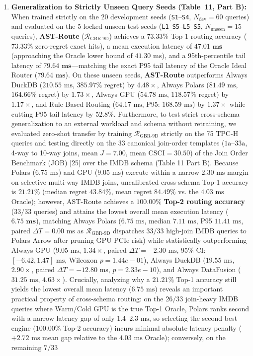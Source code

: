 \documentclass[10pt,a4paper]{article}
\begin{document}
\begin{enumerate}[leftmargin=1.5em,itemsep=2pt]
    \item \textbf{Generalization to Strictly Unseen Query Seeds (Table~11, Part B):} When trained strictly on the 20 development seeds (\texttt{S1}--\texttt{S4}, $N_{\text{dev}}=60$ queries) and evaluated on the 5 locked unseen test seeds (\texttt{L1\_S5}--\texttt{L5\_S5}, $N_{\text{unseen}}=15$ queries), \textbf{AST-Route} ($\mathcal{R}_{\text{GBR-9D}}$) achieves a $\mathbf{73.33\%}$ Top-1 routing accuracy ($\mathbf{73.33\%}$ zero-regret exact hits), a mean execution latency of $\mathbf{47.01\text{ ms}}$ (approaching the Oracle lower bound of $41.30\text{ ms}$), and a 95th-percentile tail latency of $\mathbf{79.64\text{ ms}}$---matching the exact P95 tail latency of the Oracle Ideal Router ($\mathbf{79.64\text{ ms}}$). On these unseen seeds, \textbf{AST-Route} outperforms Always DuckDB ($210.55\text{ ms}$, $385.97\%$ regret) by $\mathbf{4.48\times}$, Always Polars ($81.49\text{ ms}$, $164.66\%$ regret) by $\mathbf{1.73\times}$, Always GPU ($54.78\text{ ms}$, $118.57\%$ regret) by $\mathbf{1.17\times}$, and Rule-Based Routing ($64.17\text{ ms}$, P95: $168.59\text{ ms}$) by $\mathbf{1.37\times}$ while cutting P95 tail latency by $\mathbf{52.8\%}$. Furthermore, to test strict cross-schema generalization to an external workload and schema without retraining, we evaluated zero-shot transfer by training $\mathcal{R}_{\text{GBR-9D}}$ strictly on the 75 TPC-H queries and testing directly on the 33 canonical join-order templates ($1\text{a}$--$33\text{a}$, 4-way to 10-way joins, mean $J=7.00$, mean $\text{CSCI}=30.50$) of the Join Order Benchmark (JOB) [25] over the IMDB schema (Table 11 Part B). Because Polars ($6.75\text{ ms}$) and GPU ($9.05\text{ ms}$) execute within a narrow $2.30\text{ ms}$ margin on selective multi-way IMDB joins, uncalibrated cross-schema Top-1 accuracy is $21.21\%$ (median regret $43.84\%$, mean regret $84.49\%$ vs. the $4.03\text{ ms}$ Oracle); however, AST-Route achieves a $\mathbf{100.00\%}$ \textbf{Top-2 routing accuracy} ($33/33$ queries) and attains the lowest overall mean execution latency ($\mathbf{6.75\text{ ms}}$), matching Always Polars ($6.75\text{ ms}$, median $7.11\text{ ms}$, P95 $11.41\text{ ms}$, paired $\Delta T = 0.00\text{ ms}$ as $\mathcal{R}_{\text{GBR-9D}}$ dispatches $33/33$ high-join IMDB queries to Polars Arrow after pruning GPU PCIe risk) while statistically outperforming Always GPU ($9.05\text{ ms}$, $1.34\times$, paired $\Delta T = -2.30\text{ ms}$, 95\% CI: $[-6.42, 1.47]\text{ ms}$, Wilcoxon $p = 1.44e-01$), Always DuckDB ($19.55\text{ ms}$, $2.90\times$, paired $\Delta T = -12.80\text{ ms}$, $p = 2.33e-10$), and Always DataFusion ($31.25\text{ ms}$, $4.63\times$). Crucially, analyzing why a $21.21\%$ Top-1 accuracy still yields the lowest overall mean latency ($6.75\text{ ms}$) reveals an important practical property of cross-schema routing: on the $26/33$ join-heavy IMDB queries where Warm/Cold GPU is the true Top-1 Oracle, Polars ranks second with a narrow latency gap of only $1.4\text{--}2.3\text{ ms}$, so selecting the second-best engine ($100.00\%$ Top-2 accuracy) incurs minimal absolute latency penalty ($+2.72\text{ ms}$ mean gap relative to the $4.03\text{ ms}$ Oracle); conversely, on the remaining $7/33$ 
\end{enumerate}
\end{document}
